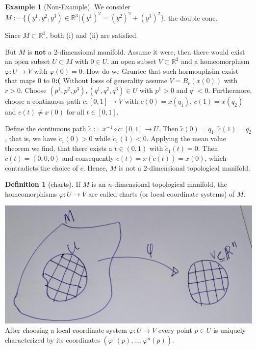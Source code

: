 \documentclass[
]{book}
\theoremstyle{definition}
\newtheorem{definition}{Definition}[chapter]
\theoremstyle{definition}
\newtheorem{example}{Example}[chapter]
\theoremstyle{definition}
\theoremstyle{definition}
\theoremstyle{remark}
\begin{document}
\begin{example}[Non-Example]
\protect\hypertarget{exm:unnamed-chunk-11}{}\label{exm:unnamed-chunk-11}We consider \(M := \{ (y^1, y^2, y^3) \in \mathbb{R}^3 | (y^1)^2 = (y^2)^2 + (y^3)^2 \}\), the double cone.

Since \(M \subset \mathbb{R}^3\), both (i) and (ii) are satisfied.

But \(M\) is \textbf{not} a 2-dimensional manifold. Assume it were, then there would exist an open subset \(U \subset M\) with \(0 \in U\), an open subset \(V \subset \mathbb{R}^2\) and a homeomorphism \(\varphi : U \rightarrow V\) with \(\varphi(0) = 0\).
{How do we Gruntee that such hormouphsim exsist that maps 0 to 0\textbf{:(}}
Without losss of generality assume \(V = B_r(x(0))\) with \(r > 0\). Choose \((p^1,p^2,p^3), (q^1,q^2,q^3) \in U\) with \(p^1 > 0\) and \(q^1 < 0\). Furthermore, choose a continuous path \(c : [0, 1] \rightarrow V\) with \(c(0) = x(q_1)\), \(c(1) = x(q_2)\) and \(c(t) \neq x(0)\) for all \(t \in [0, 1]\).

Define the continuous path \(\tilde{c} := x^{-1} \circ c : [0, 1] \rightarrow U\). Then \(\tilde{c}(0) = q_1\), \(\tilde{c}(1) = q_2\), that is, we have \(\tilde{c}_1(0) > 0\) while \(\tilde{c}_1(1) < 0\). Applying the mean value theorem we find, that there exists a \(t \in (0, 1)\) with \(\tilde{c}_1(t) = 0\). Then \(\tilde{c}(t) = (0, 0, 0)\) and consequently \(c(t) = x(\tilde{c}(t)) = x(0)\), which contradicts the choice of \(c\). Hence, \(M\) is not a 2-dimensional topological manifold.
\end{example}

\begin{definition}[charts]
\protect\hypertarget{def:unnamed-chunk-12}{}\label{def:unnamed-chunk-12}If \(M\) is an \(n\)-dimensional topological manifold, the homeomorphisms \(\varphi : U \to V\) are called charts (or local coordinate systems) of \(M\).
\end{definition}

\includegraphics{figures/ch1/fig06.jpg}
After choosing a local coordinate system \(\varphi : U \rightarrow V\) every point \(p \in U\) is uniquely characterized by its coordinates \((\varphi^1(p), \ldots , \varphi^n(p))\).
\end{document}
